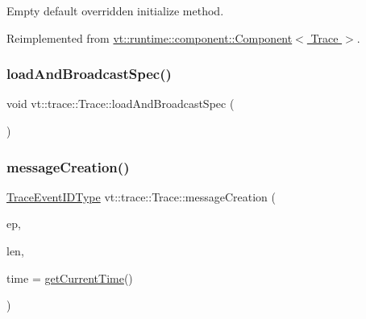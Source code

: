 Empty default overridden initialize method. 



Reimplemented from \hyperlink{structvt_1_1runtime_1_1component_1_1_component_a7f07384d294e59796add9ce6be2d6410}{vt\+::runtime\+::component\+::\+Component$<$ Trace $>$}.

\mbox{\label{structvt_1_1trace_1_1_trace_a06f74f8d2c0c2fb97be14a264fd36a45}} 
\subsubsection{\texorpdfstring{load\+And\+Broadcast\+Spec()}{loadAndBroadcastSpec()}}
{\footnotesize\ttfamily void vt\+::trace\+::\+Trace\+::load\+And\+Broadcast\+Spec (\begin{DoxyParamCaption}{ }\end{DoxyParamCaption})}

\mbox{\label{structvt_1_1trace_1_1_trace_a5b5091197568d7ed104bb40d68b4ddd7}} 
\subsubsection{\texorpdfstring{message\+Creation()}{messageCreation()}}
{\footnotesize\ttfamily \hyperlink{namespacevt_1_1trace_a64a7185f3e102df8d8258f263ccd1582}{Trace\+Event\+I\+D\+Type} vt\+::trace\+::\+Trace\+::message\+Creation (\begin{DoxyParamCaption}\item[{\hyperlink{namespacevt_1_1trace_a3c14050715ba9eceaeff51fb3de64f2f}{Trace\+Entry\+I\+D\+Type} const}]{ep,  }\item[{\hyperlink{namespacevt_1_1trace_aeb598f45d67d41db7902e494f2f0ce59}{Trace\+Msg\+Len\+Type} const}]{len,  }\item[{double const}]{time = {\ttfamily \hyperlink{structvt_1_1trace_1_1_trace_a04cf6b76b4ced1bc90d246a34c948db5}{get\+Current\+Time}()} }\end{DoxyParamCaption})}

